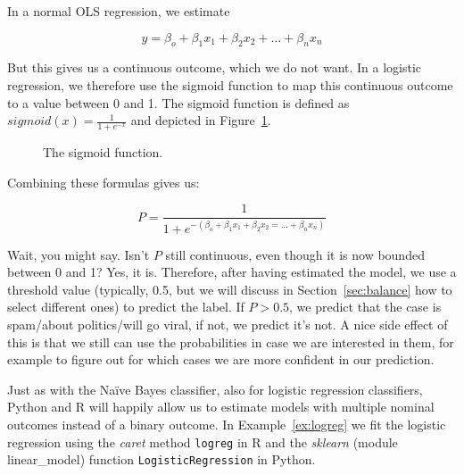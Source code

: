 In a normal OLS regression, we estimate

$$y = \beta_o + \beta_1 x_1 + \beta_2 x_2 + \ldots + \beta_n x_n$$

But this gives us a continuous outcome, which we do not want. In a
logistic regression, we therefore use the sigmoid function to map this
continuous outcome to a value between 0 and 1. The sigmoid function is
defined as $sigmoid(x) = \frac{1}{1 + e^{-x}}$ and depicted in
Figure~\ref{fig:sigmoid}.

\begin{figure}
  \centering
{}
\caption{\label{fig:sigmoid} The sigmoid function.}
\end{figure}


Combining these formulas gives us:

$$P = \frac{1}{1 + e^{-(\beta_o + \beta_1 x_1 + \beta_2 x_2 = \ldots + \beta_n x_n)}} $$


Wait, you might say. Isn't $P$ still continuous, even though it is now
bounded between 0 and 1? Yes, it is.  Therefore, after having
estimated the model, we use a threshold value (typically, 0.5, but we will discuss in Section~\ref{sec:balance} how to select different ones) to
predict the label. If $P>0.5$, we predict that the case is spam/about
politics/will go viral, if not, we predict it's not.
A nice side effect of this is that we still can use the probabilities
in case we are interested in them, for example to figure out for which
cases we are more confident in our prediction.

Just as with the Na\"ive Bayes classifier, also for logistic
regression classifiers, Python and R will happily allow us to estimate
models with multiple nominal outcomes instead of a binary outcome. In Example~\ref{ex:logreg} we fit the logistic regression using the \emph{caret} method \texttt{logreg} in R and the \emph{sklearn} (module linear\_model) function \texttt{LogisticRegression} in Python.

